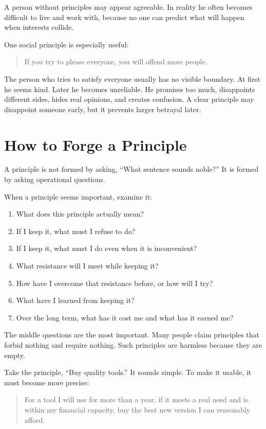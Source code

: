 A person without principles may appear agreeable. In reality he often becomes difficult to live and work with, because no one can predict what will happen when interests collide.

One social principle is especially useful:

\begin{quote}
If you try to please everyone, you will offend more people.
\end{quote}

The person who tries to satisfy everyone usually has no visible boundary. At first he seems kind. Later he becomes unreliable. He promises too much, disappoints different sides, hides real opinions, and creates confusion. A clear principle may disappoint someone early, but it prevents larger betrayal later.

\section*{How to Forge a Principle}

A principle is not formed by asking, ``What sentence sounds noble?'' It is formed by asking operational questions.

When a principle seems important, examine it:

\begin{enumerate}
\item What does this principle actually mean?
\item If I keep it, what must I refuse to do?
\item If I keep it, what must I do even when it is inconvenient?
\item What resistance will I meet while keeping it?
\item How have I overcome that resistance before, or how will I try?
\item What have I learned from keeping it?
\item Over the long term, what has it cost me and what has it earned me?
\end{enumerate}

The middle questions are the most important. Many people claim principles that forbid nothing and require nothing. Such principles are harmless because they are empty.

Take the principle, ``Buy quality tools.'' It sounds simple. To make it usable, it must become more precise:

\begin{quote}
For a tool I will use for more than a year, if it meets a real need and is within my financial capacity, buy the best new version I can reasonably afford.
\end{quote}


